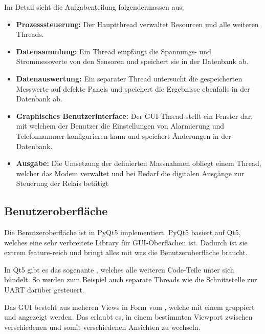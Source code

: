 Im Detail sieht die Aufgabenteilung folgendermassen aus:
\begin{itemize}
    \tightlist
    \item
        \textbf{Prozesssteuerung:} Der  Hauptthread  verwaltet  Resourcen  und
        alle weiteren Threads.
    \item
        \textbf{Datensammlung:} Ein  Thread  empf\"angt   die  Spannungs-  und
        Strommesswerte von den Sensoren und speichert sie in der Datenbank ab.
    \item
        \textbf{Datenauswertung:} Ein   separater    Thread   untersucht   die
        gespeicherten  Messwerte   auf  defekte   Panels  und   speichert  die
        Ergebnisse ebenfalls in der Datenbank ab.
    \item
        \textbf{Graphisches  Benutzerinterface:} Der   GUI-Thread  stellt  ein
        Fenster  dar,   mit  welchem   der  Benutzer  die   Einstellungen  von
        Alarmierung  und   Telefonnummer  konfigurieren  kann   und  speichert
        \"Anderungen in der Datenbank.
    \item
        \textbf{Ausgabe:} Die  Umsetzung  der definierten  Massnahmen  obliegt
        einem Thread, welcher das Modem verwaltet und bei Bedarf die digitalen
        Ausg\"ange zur Steuerung der Relais bet\"atigt
\end{itemize}


\subsection{Benutzeroberfl\"ache}
\label{subsec:software:master:GUI}


Die Benutzeroberfl\"ache  ist in  PyQt5 implementiert. PyQt5 basiert  auf Qt5,
welches eine sehr verbreitete Library f\"ur GUI-Oberfl\"achen ist. Dadurch ist
sie extrem  feature-reich und  bringt alles  mit was  die Benutzeroberfl\"ache
braucht.

In  Qt5  gibt  es  das  sogenante  ,  welches  alle  weiteren
Code-Teile unter sich b\"undelt. So werden  zum Beispiel auch separate Threads
wie die Schnittstelle zur UART dar\"uber gesteuert.

Das  GUI  besteht  aus  meheren  Views in  Form  vom  ,  welche
mit   einem      gruppiert  und   angezeigt   werden. Das
  erlaubt  es,  in  einem  bestimmten  Viewport  zwischen
verschiedenen  und somit verschiedenen Ansichten zu wechseln.

